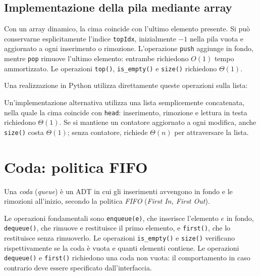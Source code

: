 \subsection{Implementazione della pila mediante array}
\label{sec:fi-adt-pila-implementazione-array}

Con un array dinamico, la cima coincide con l'ultimo elemento
presente. Si può conservarne esplicitamente l'indice
\texttt{topIdx}, inizialmente \(-1\) nella pila vuota e aggiornato
a ogni inserimento o rimozione. L'operazione \texttt{push}
aggiunge in fondo, mentre \texttt{pop} rimuove l'ultimo elemento:
entrambe richiedono \(O(1)\) tempo ammortizzato.
Le operazioni \texttt{top()}, \texttt{is\_empty()} e
\texttt{size()} richiedono \(\Theta(1)\).

Una realizzazione in Python utilizza direttamente queste operazioni
sulla lista:



Un'implementazione alternativa utilizza una lista semplicemente
concatenata, nella quale la cima coincide con \texttt{head}:
inserimento, rimozione e lettura in testa richiedono
\(\Theta(1)\). Se si mantiene un contatore aggiornato a ogni
modifica, anche \texttt{size()} costa \(\Theta(1)\); senza
contatore, richiede \(\Theta(n)\) per attraversare la lista.

\section{Coda: politica FIFO}
\label{sec:fi-adt-coda}

\begin{definition}[Coda]
\label{def:fi-adt-coda}
Una \emph{coda} (\emph{queue}) è un ADT in cui gli inserimenti
avvengono in fondo e le rimozioni all'inizio, secondo la politica
\emph{FIFO} (\emph{First In, First Out}).
\end{definition}

Le operazioni fondamentali sono \texttt{enqueue(e)}, che inserisce
l'elemento \(e\) in fondo, \texttt{dequeue()}, che rimuove e
restituisce il primo elemento, e \texttt{first()}, che lo
restituisce senza rimuoverlo. Le operazioni \texttt{is\_empty()}
e \texttt{size()} verificano rispettivamente se la coda è vuota
e quanti elementi contiene. Le operazioni \texttt{dequeue()} e
\texttt{first()} richiedono una coda non vuota: il comportamento
in caso contrario deve essere specificato dall'interfaccia.

